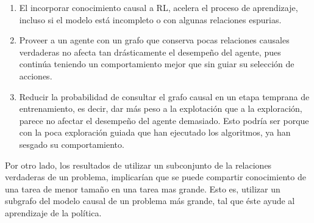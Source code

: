 \begin{enumerate}
\item El incorporar conocimiento causal a RL, acelera el proceso de
aprendizaje, incluso si el modelo está incompleto o con algunas relaciones espurias.
    \item Proveer a un agente con un grafo que conserva pocas relaciones
    causales verdaderas no afecta tan drásticamente el desempeño del agente, pues 
    continúa teniendo un comportamiento mejor que sin guiar su selección de acciones.
    \item Reducir la probabilidad de consultar el grafo causal en un etapa 
    temprana de entrenamiento, es decir, dar más peso a la explotación que a la exploración, parece no afectar el desempeño del agente demasiado. Esto podría
    ser porque con la poca exploración guiada que han ejecutado los algoritmos,
    ya han sesgado su comportamiento.
\end{enumerate}


Por otro lado, los resultados de utilizar un subconjunto de
la relaciones verdaderas de un problema, implicarían que
se puede compartir conocimiento de una tarea de menor tamaño
en una tarea mas grande. Esto es, utilizar un subgrafo del modelo
causal de un problema más grande, tal que éste ayude al
aprendizaje de la política.



